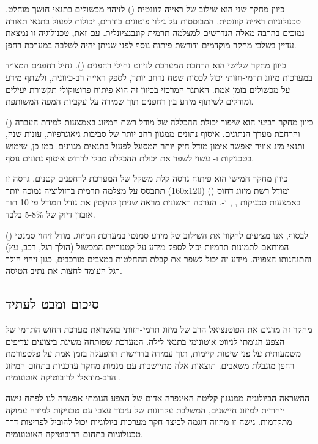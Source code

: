 כיוון מחקר שני הוא שילוב של ראייה קוונטית () לזיהוי מכשולים בתנאי חושך מוחלט. טכנולוגיות ראייה קוונטית, המבוססות על גילוי פוטונים בודדים, יכולות לפעול בתנאי תאורה נמוכים בהרבה מאלה הנדרשים למצלמה תרמית קונבנציונלית. עם זאת, טכנולוגיה זו נמצאת עדיין בשלבי מחקר מוקדמים ודורשת פיתוח נוסף לפני שניתן יהיה לשלבה במערכת רחפן.

כיוון מחקר שלישי הוא הרחבת המערכת לניווט נחילי רחפנים (). נחיל רחפנים המצויד במערכות מיזוג תרמי-חזותי יכול לכסות שטח נרחב יותר, לספק ראייה רב-כיוונית, ולשתף מידע על מכשולים בזמן אמת. האתגר המרכזי בכיוון זה הוא פיתוח פרוטוקולי תקשורת יעילים ומודלים לשיתוף מידע בין רחפנים תוך שמירה על עקביות המפה המשותפת.

כיוון מחקר רביעי הוא שיפור יכולת ההכללה של מודל רשת המיזוג באמצעות למידת העברה () והרחבת מערך הנתונים. איסוף נתונים ממגוון רחב יותר של סביבות גיאוגרפיות, עונות שנה, ותנאי מזג אוויר יאפשר אימון מודל חזק יותר המסוגל לפעול בתנאים מגוונים. כמו כן, שימוש בטכניקות  ו- עשוי לשפר את יכולת ההכללה מבלי לדרוש איסוף נתונים נוסף.

כיוון מחקר חמישי הוא פיתוח גרסה קלת משקל של המערכת לרחפנים קטנים. גרסה זו תתבסס על מצלמה תרמית ברזולוציה נמוכה יותר (160x120) ומודל רשת מיזוג דחוס () באמצעות טכניקות , , ו-. הערכה ראשונית מראה שניתן להקטין את גודל המודל פי 10 תוך אובדן דיוק של 5-8\% בלבד.

לבסוף, אנו מציעים לחקור את השילוב של מידע סמנטי במערכת המיזוג. מודל זיהוי סמנטי () המותאם לתמונות תרמיות יכול לספק מידע על קטגוריית המכשול (הולך רגל, רכב, עץ) והתנהגותו הצפויה. מידע זה יכול לשפר את קבלת ההחלטות במצבים מורכבים, כגון זיהוי הולך רגל העומד לחצות את נתיב הטיסה.

\subsection{סיכום ומבט לעתיד}
\label{sec:ch09_final}

מחקר זה מדגים את הפוטנציאל הרב של מיזוג תרמי-חזותי בהשראת מערכת החוש התרמי של הצפע הגומתי לניווט אוטונומי בתנאי לילה. המערכת שפותחה משיגת ביצועים עדיפים משמעותית על פני שיטות קיימות, תוך עמידה בדרישות ההפעלה בזמן אמת על פלטפורמת רחפן מוגבלת משאבים. תוצאות אלה מתיישבות עם מגמות מחקר עדכניות בתחום המיזוג הרב-מודאלי לרובוטיקה אוטונומית \cite{Thrun2005ProbRobotics, Kalman1960}.

ההשראה הביולוגית ממנגנון קליטת האינפרה-אדום של הצפע הגומתי אפשרה לנו לפתח גישה ייחודית למיזוג חיישנים, המשלבת עקרונות של עיבוד עצבי עם טכניקות למידה עמוקה מתקדמות. גישה זו מהווה דוגמה לכיצד חקר מערכות ביולוגיות יכול להוביל לפריצות דרך טכנולוגיות בתחום הרובוטיקה האוטונומית.

